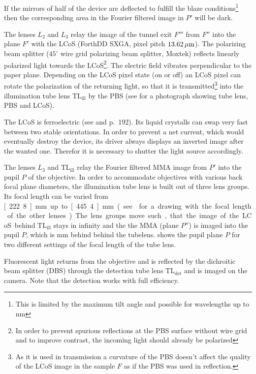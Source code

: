 If the mirrors of half of the device are deflected to fulfill the
blaze conditions\footnote{This is limited by the maximum tilt angle
  and possible for wavelengths up to \unit[800]{nm}} then the
corresponding area in the Fourier filtered image in $P'$ will be dark.

The lenses $L_2$ and $L_3$ relay the image of the tunnel exit $F'''$
from $F''$ into the plane $F'$ with the LCoS (ForthDD SXGA, pixel
pitch $\unit[13.62]{\mu m}$). The polarizing beam splitter ($45^\circ$
wire grid polarizing beam splitter, Moxtek) reflects linearly
polarized light towards the LCoS\footnote{In order to prevent spurious
  reflections at the PBS surface without wire grid and to improve
  contrast, the incoming light should already be polarized}. The
electric field vibrates perpendicular to the paper plane. Depending on
the LCoS pixel state (on or off) an LCoS pixel can rotate the
polarization of the returning light, so that it is
transmitted\footnote{As it is used in transmission a curvature of the
  PBS doesn't affect the quality of the LCoS image in the sample $F$
  as if the PBS was used in reflection.}  into the illumination tube
lens $\textrm{TL}_\textrm{ill}$ by the PBS (see  for
a photograph showing tube lens, PBS and LCoS).

The LCoS is ferroelectric (see \cite{1991Saleh} and \cite{Goodman1996}
p.~192).  Its liquid crystalls can swap very fast between two stable
orientations. In order to prevent a net current, which would
eventually destroy the device, its driver always displays an inverted
image after the wanted one. Therefor it is necessary to shutter the
light source accordingly.

The lenses $L_3$ and $\textrm{TL}_\textrm{ill}$ relay the Fourier
filtered MMA image from $P'$ into the pupil $P$ of the objective. In
order to accommodate objectives with various back focal plane
diameters, the illumination tube lens is built out of three lens
groups. Its focal length can be varied from \unit[222.8]{mm} up to
\unit[445.4]{mm} (see  for a drawing with the
focal length of the other lenses). The lens groups move such, that the
image of the LCoS behind $\textrm{TL}_\textrm{ill}$ stays in infinity
and the the MMA (plane $P''$) is imaged into the pupil $P$, which is
\unit[250]{mm} behind behind the tubelens. 
shows the pupil plane $P$ for two different settings of the focal
length of the tube lens.

Fluorescent light returns from the objective and is reflected by the
dichroitic beam splitter (DBS) through the detection tube lens
$\textrm{TL}_\textrm{det}$ and is imaged on the camera. Note that the
detection works with full efficiency.

